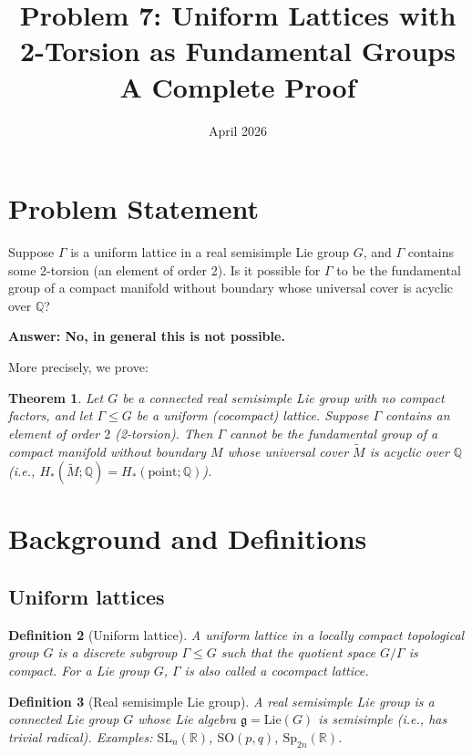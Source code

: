 \documentclass[12pt]{article}
\title{Problem 7: Uniform Lattices with 2-Torsion as Fundamental Groups\\
\large A Complete Proof}
\author{}
\date{April 2026}
\newtheorem{theorem}{Theorem}
\newtheorem{definition}[theorem]{Definition}
\begin{document}
\maketitle

\section{Problem Statement}

Suppose $\Gamma$ is a uniform lattice in a real semisimple Lie group $G$, and $\Gamma$ contains some 2-torsion (an element of order 2). Is it possible for $\Gamma$ to be the fundamental group of a compact manifold without boundary whose universal cover is acyclic over $\mathbb{Q}$?

\textbf{Answer: No, in general this is not possible.}

More precisely, we prove:

\begin{theorem}\label{thm:main}
Let $G$ be a connected real semisimple Lie group with no compact factors, and let $\Gamma \leq G$ be a uniform (cocompact) lattice. Suppose $\Gamma$ contains an element of order $2$ (2-torsion). Then $\Gamma$ cannot be the fundamental group of a compact manifold without boundary $M$ whose universal cover $\widetilde{M}$ is acyclic over $\mathbb{Q}$ (i.e., $H_*(\widetilde{M}; \mathbb{Q}) = H_*(\text{point}; \mathbb{Q})$).
\end{theorem}

\section{Background and Definitions}

\subsection{Uniform lattices}

\begin{definition}[Uniform lattice]
A \emph{uniform lattice} in a locally compact topological group $G$ is a discrete subgroup $\Gamma \leq G$ such that the quotient space $G/\Gamma$ is compact. For a Lie group $G$, $\Gamma$ is also called a \emph{cocompact lattice}.
\end{definition}

\begin{definition}[Real semisimple Lie group]
A real semisimple Lie group is a connected Lie group $G$ whose Lie algebra $\mathfrak{g} = \text{Lie}(G)$ is semisimple (i.e., has trivial radical). Examples: $\mathrm{SL}_n(\mathbb{R})$, $\mathrm{SO}(p,q)$, $\mathrm{Sp}_{2n}(\mathbb{R})$.
\end{definition}
\end{document}

